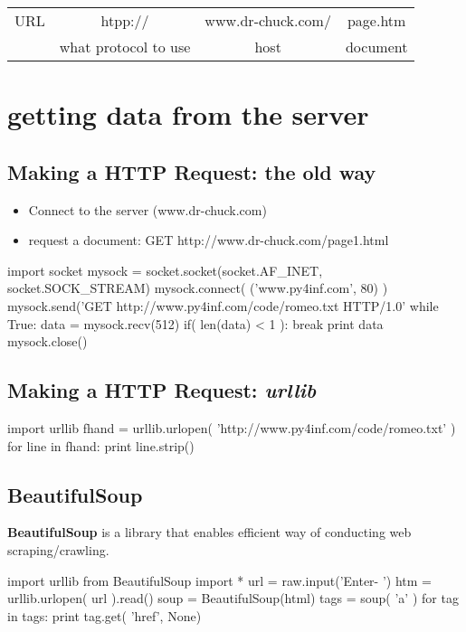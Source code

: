 \documentclass[a4paper,12pt]{report}
\begin{document}
\begin{tabular}{cccc}
URL & htpp:// &www.dr-chuck.com/ & page.htm \\
    & what protocol to use & host & document \\
\end{tabular}

\section{getting data from the server}
\subsection{Making a HTTP Request: the old way}
\begin{itemize}
\item Connect to the server (www.dr-chuck.com)
\item request a document: GET http://www.dr-chuck.com/page1.html
\end{itemize}

\begin{tcolorbox}
\begin{python}
import socket
mysock = socket.socket(socket.AF_INET, socket.SOCK_STREAM) %
mysock.connect( ('www.py4inf.com', 80) ) %
mysock.send('GET http://www.py4inf.com/code/romeo.txt HTTP/1.0\n\n'
while True:
	data = mysock.recv(512) %
	if( len(data) < 1 ): %
		break
	print data
mysock.close()
\end{python}
\end{tcolorbox}

\subsection{Making a HTTP Request: \textit{urllib}}
\begin{tcolorbox}
\begin{python}
import urllib
fhand = urllib.urlopen( 'http://www.py4inf.com/code/romeo.txt' )
for line in fhand:
	print line.strip()
\end{python}
\end{tcolorbox}

\subsection{BeautifulSoup}
\textbf{BeautifulSoup} is a library that enables efficient way of conducting  web scraping/crawling.
\begin{tcolorbox}
\begin{python}
import urllib
from BeautifulSoup import *
url = raw.input('Enter- ') %
htm = urllib.urlopen( url ).read() %
soup = BeautifulSoup(html) %
tags = soup( 'a' )
for tag in tags:
	print tag.get( 'href', None)
\end{python}
\end{tcolorbox}
\end{document}

